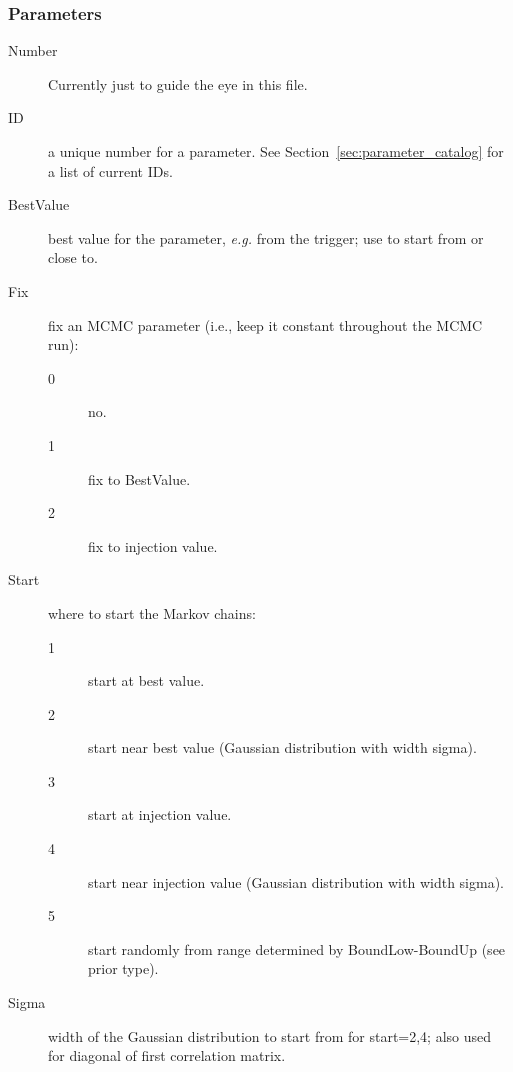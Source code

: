 \documentclass[10pt]{article}
\begin{document}
  
  
\subsubsection{Parameters}
\begin{description}                
\item[Number] Currently just to guide the eye in this file.
\item[ID] a unique number for a parameter.  See Section~\ref{sec:parameter_catalog} for a list of current IDs.
\item[BestValue] best value for the parameter, \textit{e.g.} from the trigger;  use to start from or close to.
\item[Fix] fix an MCMC parameter (i.e., keep it constant throughout the MCMC run):
  \begin{description}                
  \item[0] no.
  \item[1] fix to BestValue.
  \item[2] fix to injection value.
  \end{description}                
\item[Start] where to start the Markov chains:
  \begin{description}                
  \item[1] start at best value.
  \item[2] start near best value (Gaussian distribution with width sigma).
  \item[3] start at injection value.
  \item[4] start near injection value (Gaussian distribution with width sigma).
  \item[5] start randomly from range determined by BoundLow-BoundUp (see prior type).
  \end{description}                
\item[Sigma] width of the Gaussian distribution to start from for start=2,4; also used for diagonal of first correlation matrix.
\end{description}                
\end{document}
